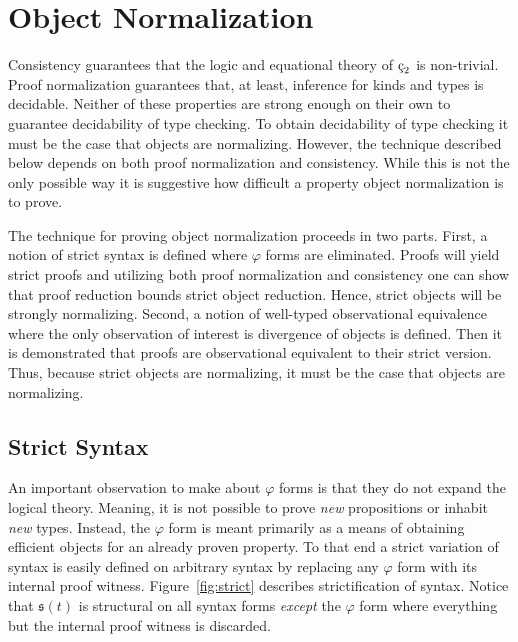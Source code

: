 \chapter{Object Normalization}
\label{chap:5}

Consistency guarantees that the logic and equational theory of $\ced$ is non-trivial.
Proof normalization guarantees that, at least, inference for kinds and types is decidable.
Neither of these properties are strong enough on their own to guarantee decidability of type checking.
To obtain decidability of type checking it must be the case that objects are normalizing.
However, the technique described below depends on both proof normalization and consistency.
While this is not the only possible way it is suggestive how difficult a property object normalization is to prove.

The technique for proving object normalization proceeds in two parts.
First, a notion of strict syntax is defined where $\varphi$ forms are eliminated.
Proofs will yield strict proofs and utilizing both proof normalization and consistency one can show that proof reduction bounds strict object reduction.
Hence, strict objects will be strongly normalizing.
Second, a notion of well-typed observational equivalence where the only observation of interest is divergence of objects is defined.
Then it is demonstrated that proofs are observational equivalent to their strict version.
Thus, because strict objects are normalizing, it must be the case that objects are normalizing.

\section{Strict Syntax}

An important observation to make about $\varphi$ forms is that they do not expand the logical theory.
Meaning, it is not possible to prove \textit{new} propositions or inhabit \textit{new} types.
Instead, the $\varphi$ form is meant primarily as a means of obtaining efficient objects for an already proven property.
To that end a strict variation of syntax is easily defined on arbitrary syntax by replacing any $\varphi$ form with its internal proof witness.
Figure~\ref{fig:strict} describes strictification of syntax.
Notice that $\mathfrak{s}(t)$ is structural on all syntax forms \textit{except} the $\varphi$ form where everything but the internal proof witness is discarded.



